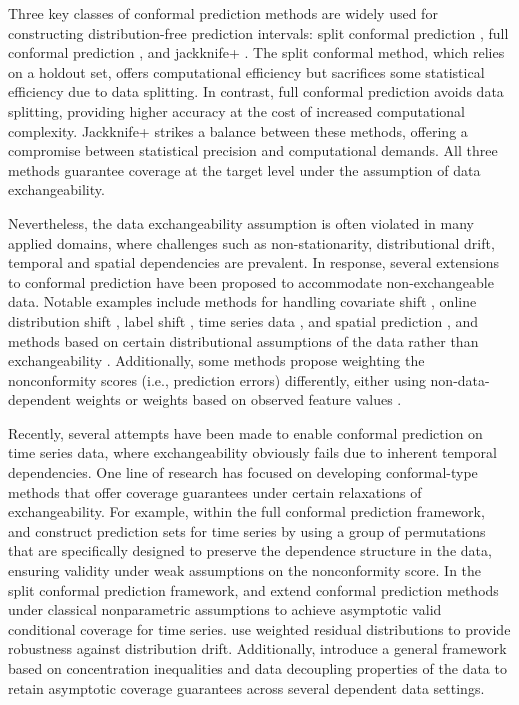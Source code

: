 \documentclass[
  11pt,
  a4paper,
]{article}
\theoremstyle{plain}
\theoremstyle{remark}
\begin{document}
Three key classes of conformal prediction methods are widely used for
constructing distribution-free prediction intervals: split conformal
prediction \autocite{vovk2005}, full conformal prediction
\autocite{vovk2005}, and jackknife+ \autocite{barber2021}. The split
conformal method, which relies on a holdout set, offers computational
efficiency but sacrifices some statistical efficiency due to data
splitting. In contrast, full conformal prediction avoids data splitting,
providing higher accuracy at the cost of increased computational
complexity. Jackknife+ strikes a balance between these methods, offering
a compromise between statistical precision and computational demands.
All three methods guarantee coverage at the target level under the
assumption of data exchangeability.

Nevertheless, the data exchangeability assumption is often violated in
many applied domains, where challenges such as non-stationarity,
distributional drift, temporal and spatial dependencies are prevalent.
In response, several extensions to conformal prediction have been
proposed to accommodate non-exchangeable data. Notable examples include
methods for handling covariate shift
\autocite{tibshirani2019,lei2021,yang2024}, online distribution shift
\autocite{gibbs2021,zaffran2022,bastani2022}, label shift
\autocite{podkopaev2021}, time series data
\autocite{chernozhukov2018,gibbs2021,xu2021,xu2023,zaffran2022}, and
spatial prediction \autocite{mao2024}, and methods based on certain
distributional assumptions of the data rather than exchangeability
\autocite{oliveira2024,xu2021,xu2023}. Additionally, some methods
propose weighting the nonconformity scores (i.e., prediction errors)
differently, either using non-data-dependent weights
\autocite{barber2023} or weights based on observed feature values
\autocite{tibshirani2019,guan2023,hore2023}.

Recently, several attempts have been made to enable conformal prediction
on time series data, where exchangeability obviously fails due to
inherent temporal dependencies. One line of research has focused on
developing conformal-type methods that offer coverage guarantees under
certain relaxations of exchangeability. For example, within the full
conformal prediction framework, \textcite{chernozhukov2018} and
\textcite{yu2022} construct prediction sets for time series by using a
group of permutations that are specifically designed to preserve the
dependence structure in the data, ensuring validity under weak
assumptions on the nonconformity score. In the split conformal
prediction framework, \textcite{xu2021} and \textcite{xu2023} extend
conformal prediction methods under classical nonparametric assumptions
to achieve asymptotic valid conditional coverage for time series.
\textcite{barber2023} use weighted residual distributions to provide
robustness against distribution drift. Additionally,
\textcite{oliveira2024} introduce a general framework based on
concentration inequalities and data decoupling properties of the data to
retain asymptotic coverage guarantees across several dependent data
settings.
\end{document}
